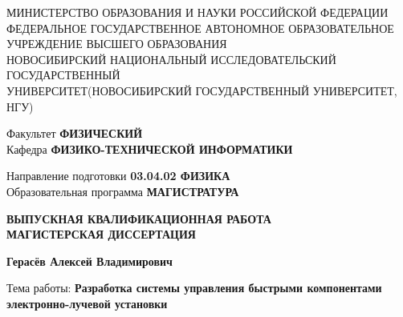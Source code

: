 \documentclass[14pt,russian,a4paper]{extarticle}
\begin{document}
\thispagestyle{empty}

{\footnotesize 

\begin{center}
    МИНИСТЕРСТВО ОБРАЗОВАНИЯ И НАУКИ РОССИЙСКОЙ ФЕДЕРАЦИИ \\
    ФЕДЕРАЛЬНОЕ ГОСУДАРСТВЕННОЕ АВТОНОМНОЕ ОБРАЗОВАТЕЛЬНОЕ \\
    УЧРЕЖДЕНИЕ ВЫСШЕГО ОБРАЗОВАНИЯ \\
    \guillemotleft НОВОСИБИРСКИЙ НАЦИОНАЛЬНЫЙ ИССЛЕДОВАТЕЛЬСКИЙ ГОСУДАРСТВЕННЫЙ \\
    УНИВЕРСИТЕТ\guillemotright (НОВОСИБИРСКИЙ ГОСУДАРСТВЕННЫЙ УНИВЕРСИТЕТ, НГУ)
\end{center}

\vspace{4mm}

\begin{flushleft}
    Факультет {\bf ФИЗИЧЕСКИЙ} \\
    Кафедра {\bf ФИЗИКО-ТЕХНИЧЕСКОЙ ИНФОРМАТИКИ}
\end{flushleft}
\begin{flushleft}
    Направление подготовки {\bf 03.04.02 ФИЗИКА} \\
    Образовательная программа {\bf МАГИСТРАТУРА}
\end{flushleft}

\vspace{4mm}


\begin{center}
    {\bf
    ВЫПУСКНАЯ КВАЛИФИКАЦИОННАЯ РАБОТА \\
    МАГИСТЕРСКАЯ ДИССЕРТАЦИЯ
    }
\end{center}

\begin{center}
    {\bf Герасёв Алексей Владимирович}
\end{center}

\begin{center}
    Тема работы: {\bf Разработка системы управления быстрыми компонентами электронно-лучевой установки}
\end{center}

\vspace{4mm}


\vspace{2mm}

}
\end{document}
